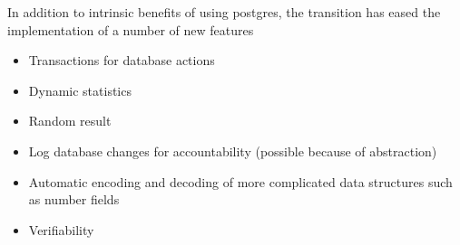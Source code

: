 \documentclass{article}
\begin{document}
In addition to intrinsic benefits of using postgres, the transition has eased the implementation of a number of new features
\begin{itemize}
\item Transactions for database actions
\item Dynamic statistics
\item Random result
\item Log database changes for accountability (possible because of abstraction)
\item Automatic encoding and decoding of more complicated data structures such as number fields
\item Verifiability
\end{itemize}
\end{document}
